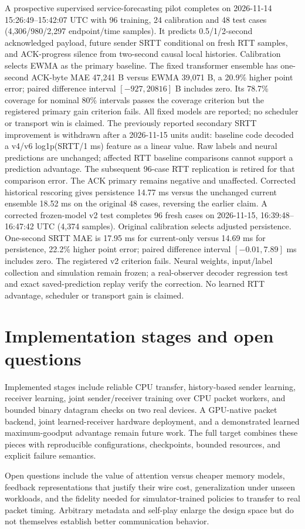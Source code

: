 \documentclass[11pt]{article}
\begin{document}
A prospective supervised service-forecasting pilot completes on 2026-11-14
15:26:49--15:42:07 UTC with 96 training, 24 calibration and 48 test cases
(4,306/980/2,297 endpoint/time samples). It predicts 0.5/1/2-second acknowledged
payload, future sender SRTT conditional on fresh RTT samples, and ACK-progress
silence from two-second causal local histories. Calibration selects EWMA as the
primary baseline. The fixed transformer ensemble has one-second ACK-byte MAE
47,241 B versus EWMA 39,071 B, a 20.9\% higher point error; paired difference
interval $[-927,20816]$ B includes zero. Its 78.7\% coverage for nominal 80\%
intervals passes the coverage criterion but the registered primary gain criterion
fails. All fixed models are reported; no scheduler or transport win is claimed.
The previously reported secondary SRTT improvement is withdrawn after a
2026-11-15 units audit: baseline code decoded a v4/v6 log1p(SRTT/1 ms) feature as
a linear value. Raw labels and neural predictions are unchanged; affected RTT
baseline comparisons cannot support a prediction advantage. The subsequent
96-case RTT replication is retired for that comparison error. The ACK primary
remains negative and unaffected. Corrected historical rescoring gives persistence 14.77 ms versus the unchanged
current ensemble 18.52 ms on the original 48 cases, reversing the earlier claim.
A corrected frozen-model v2 test completes 96 fresh cases on 2026-11-15,
16:39:48--16:47:42 UTC (4,374 samples). Original calibration selects adjusted
persistence. One-second SRTT MAE is 17.95 ms for current-only versus 14.69 ms for
persistence, 22.2\% higher point error; paired difference interval
$[-0.01,7.89]$ ms includes zero. The registered v2 criterion fails. Neural
weights, input/label collection and simulation remain frozen; a real-observer
decoder regression test and exact saved-prediction replay verify the correction.
No learned RTT advantage, scheduler or transport gain is claimed.



\section{Implementation stages and open questions}
Implemented stages include reliable CPU transfer, history-based sender learning,
receiver learning, joint sender/receiver training over CPU packet workers, and
bounded binary datagram checks on two real devices. A GPU-native packet backend,
joint learned-receiver hardware deployment, and a demonstrated learned
maximum-goodput advantage remain future work.
The full target combines these pieces with reproducible configurations,
checkpoints, bounded resources, and explicit failure semantics.

Open questions include the value of attention versus cheaper memory models,
feedback representations that justify their wire cost, generalization under
unseen workloads, and the fidelity needed for simulator-trained policies to
transfer to real packet timing. Arbitrary metadata and self-play enlarge the
design space but do not themselves establish better communication behavior.



\end{document}
